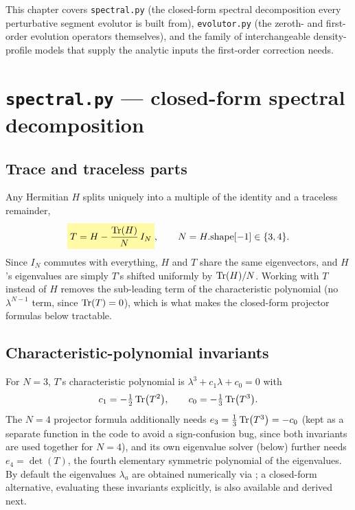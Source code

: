 This chapter covers \texttt{spectral.py} (the closed-form spectral
decomposition every perturbative segment evolutor is built from),
\texttt{evolutor.py} (the zeroth- and first-order evolution operators
themselves), and the family of interchangeable density-profile models that
supply the analytic inputs the first-order correction needs.

\section{\texttt{spectral.py} --- closed-form spectral decomposition}


\begin{theorybox}
\subsection*{Trace and traceless parts}
Any Hermitian $H$ splits uniquely into a multiple of the identity and a
traceless remainder,
\begin{equation}
  \keyresult{T = H - \frac{\Tr(H)}{N}\,I_N}, \qquad N=H.\text{shape}[-1]\in\{3,4\}.
\end{equation}
Since $I_N$ commutes with everything, $H$ and $T$ share the same
eigenvectors, and $H$'s eigenvalues are simply $T$'s shifted uniformly by
$\Tr(H)/N$. Working with $T$ instead of $H$ removes the sub-leading term of
the characteristic polynomial (no $\lambda^{N-1}$ term, since $\Tr(T)=0$),
which is what makes the closed-form projector formulas below tractable.

\subsection*{Characteristic-polynomial invariants}
For $N=3$, $T$'s characteristic polynomial is $\lambda^3+c_1\lambda+c_0=0$
with
\begin{equation}
  c_1 = -\tfrac12\Tr(T^2), \qquad c_0 = -\tfrac13\Tr(T^3).
\end{equation}
The $N=4$ projector formula additionally needs
$e_3=\tfrac13\Tr(T^3)=-c_0$ (kept as a separate function in the code to
avoid a sign-confusion bug, since both invariants are used together for
$N=4$), and its own eigenvalue solver (below) further needs
$e_4=\det(T)$, the fourth elementary symmetric polynomial of the
eigenvalues. By default the eigenvalues $\lambda_a$ are obtained
numerically via ; a closed-form alternative,
evaluating these invariants explicitly, is also available and derived next.
\end{theorybox}

